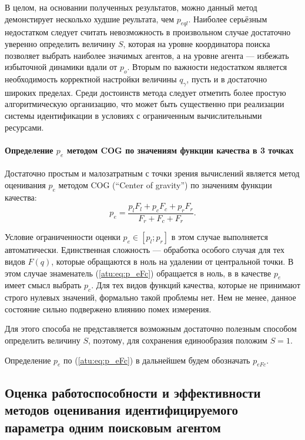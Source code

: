 
В целом, на основании полученных результатов, можно данный метод
демонстирует нескольхо худшие реультата, чем $p_{eql}$.
Наиболее серьёзным недостатком следует считать
невозможность в произвольном случае достаточно уверенно
определить величину $S$, которая на уровне координатора поиска
позволяет выбрать наиболее значимых агентов, а на уровне агента ---
избежать избыточной динамики вдали от $p_o$.
Вторым по важности недостатком является необходимость
корректной настройки величины $q_\gamma$, пусть и в достаточно широких пределах.
Среди достоинств метода следует отметить более простую
алгоритмическую организацию, что может быть существенно
при реализации системы идентификации в условиях с ограниченным вычислительными
ресурсами.



\paragraph{Определение $p_e$ методом COG по значениям функции качества в 3 точках}

Достаточно простым и малозатратным с точки зрения вычислений
является метод оценивания $p_e$ методом COG (``Center of gravity'')
по значениям функции качества:
%
\begin{equation}
  p_e =
  \frac{p_l F_l + p_c F_c + p_r F_r}{ F_r + F_c + F_r}  .
  \label{atu:eq:p_eFc}
\end{equation}

Условие ограниченности оценки
$p_e \in [p_l;p_r]$ в этом случае выполняется автоматически.
Единственная сложность --- обработка особого случая для тех видов
$F(q)$, которые обращаются в ноль на удалении от центральной точки.
В этом случае знаменатель (\ref{atu:eq:p_eFc}) обращается в ноль,
в в качестве $p_e$ имеет смысл выбрать $p_c$.
Для тех видов функций качества, которые не принимают строго нулевых
значений, формально такой проблемы нет. Нем не менее,
данное состояние сильно подвержено влиянию помех измерения.

Для этого способа не представляется возможным
достаточно полезным способом определить величину $S$,
поэтому, для сохранения единообразия положим $S=1$.

Определение $p_e$ по (\ref{atu:eq:p_eFc}) в дальнейшем будем обозначать $p_{eFc}$.




\subsection{Оценка работоспособности и эффективности методов оценивания идентифицируемого параметра одним поисковым агентом}  %


